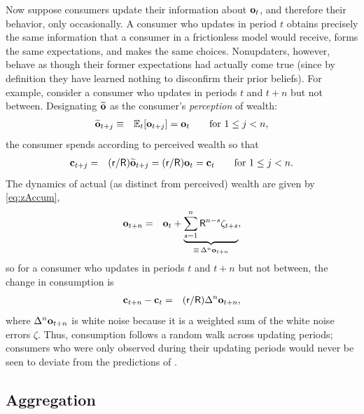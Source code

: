 \documentclass[titlepage]{./econtex}
\begin{document}
Now suppose consumers update their information about $\mathbf{o}_t$, and therefore their behavior, only occasionally.  A consumer who updates in period $t$ obtains precisely the same information that a consumer in a frictionless model would receive, forms the same expectations, and makes the same choices.  Nonupdaters, however, behave as though their former expectations had actually come true (since by definition they have learned nothing to disconfirm their prior beliefs).  For example, consider a consumer who updates in periods $t$ and $t+n$ but not between.  Designating $\widetilde{\mathbf{o}}$ as the consumer's {\it perception} of wealth:
  \begin{eqnarray*}
\widetilde{\mathbf{o}}_{t+j} & \equiv & \operatorname{\mathbb{E}}_{t}[\mathbf{o}_{t+j}] = \mathbf{o}_{t} \qquad \text{for }  1\le j < n,
\end{eqnarray*}
  the consumer spends according to perceived wealth so that
  \begin{eqnarray*}
\mathbf{c}_{t+j} & = & (\mathsf{r}/\mathsf{R})\widetilde{\mathbf{o}}_{t+j} = (\mathsf{r}/\mathsf{R})     \mathbf{o} _{t} = \mathbf{c}_{t} \qquad \text{for }  1\le j < n.
\end{eqnarray*}
The dynamics of actual (as distinct from perceived) wealth are given by \eqref{eq:zAccum},
\begin{eqnarray*}
 \mathbf{o}_{t+n} & = & \mathbf{o}_{t}+\underbrace{\sum_{s=1}^{n} \mathsf{R}^{n-s}\zeta_{t+s}}_{\equiv\,\Delta^{n} \mathbf{o}_{t+n}},
\end{eqnarray*}
 so for a consumer who updates in periods $t$ and $t+n$ but not between, the change in consumption is
\begin{eqnarray*}
         \mathbf{c}_{t+n}-\mathbf{c}_{t}  & = & (\mathsf{r}/\mathsf{R})\Delta^{n}\mathbf{o}_{t+n},
\end{eqnarray*}
  where $\Delta^{n}\mathbf{o}_{t+n}$ is white noise because it is a weighted sum of the white noise errors $\zeta$.  Thus, consumption follows a random walk across updating periods; consumers who were only observed during their updating periods would never be seen to deviate from the predictions of \cite{hallRandomWalk}.


\subsection{Aggregation}
\end{document}
